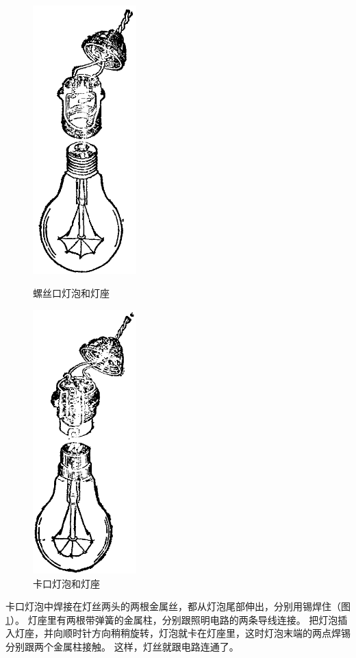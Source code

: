 \begin{figure}[htbp]
    \centering
    \begin{minipage}{7cm}
    \centering
    \includegraphics[width=4cm]{../pic/czwl2-ch11-2}
    \caption{螺丝口灯泡和灯座}\label{fig:11-2}
    \end{minipage}
    \qquad
    \begin{minipage}{7cm}
    \centering
    \includegraphics[width=4cm]{../pic/czwl2-ch11-3}
    \caption{卡口灯泡和灯座}\label{fig:11-3}
    \end{minipage}
\end{figure}

卡口灯泡中焊接在灯丝两头的两根金属丝，都从灯泡尾部伸出，分别用锡焊住（图 \ref{fig:11-3}）。
灯座里有两根带弹簧的金属柱，分别跟照明电路的两条导线连接。
把灯泡插入灯座，并向顺时针方向稍稍旋转，灯泡就卡在灯座里，这时灯泡末端的两点焊锡分别跟两个金属柱接触。
这样，灯丝就跟电路连通了。


